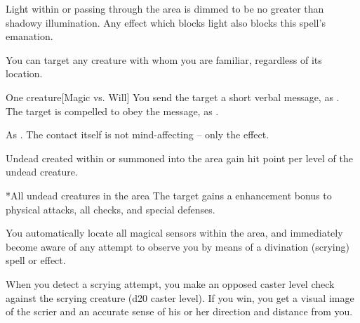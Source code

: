 \spellrng{\rngtouch}
\spelldur{\durlong \dismissable}
\spellline
\spelleffect Light within or passing through the area is dimmed to be no greater than shadowy illumination.
\spellnotes Any effect which blocks light also blocks this spell's emanation.

\spellspecial You can target any creature with whom you are familiar, regardless of its location.
\begin{spelltarget}{One creature}[Magic vs. Will]
    \spelleffect You send the target a short verbal message, as .
    \spellsuccess The target is compelled to obey the message, as .
\end{spelltarget}
\spellnotes As .
\spellnotes The contact itself is not mind-affecting -- only the  effect.

\spellline
\spelleffect Undead created within or summoned into the area gain  hit point per level of the undead creature.
\begin{spelltarget}*{All undead creatures in the area}
    \spelleffect The target gains a  enhancement bonus to physical attacks, all checks, and special defenses.
\end{spelltarget}

\spelldur{\durext}
\spellline
\spelleffect You automatically locate all magical sensors within the area, and immediately become aware of any attempt to observe you by means of a divination (scrying) spell or effect.

\par When you detect a scrying attempt, you make an opposed caster level check against the scrying creature (d20 \add caster level). If you win, you get a visual image of the scrier and an accurate sense of his or her direction and distance from you.

